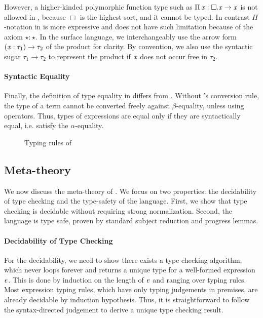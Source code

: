 However, a higher-kinded polymorphic function type such as $\Pi \, \mathit{x}  :  \Box  .  \mathit{x}  \rightarrow  \mathit{x}$ is not allowed in \cc, because $\Box$ is
the highest sort, and it cannot be typed. In contrast $ \Pi $-notation in
\ecore is more expressive and does not have such limitation because of
the axiom $\star:\star$. In the surface language, we
interchangeably use the arrow form $(  \mathit{x}  :  \tau_{{\mathrm{1}}}  )  \rightarrow  \tau_{{\mathrm{2}}}$ of the product for
clarity. By convention, we also use the syntactic sugar $\tau_{{\mathrm{1}}}  \longrightarrow  \tau_{{\mathrm{2}}}$ to represent the product if $\mathit{x}$ does not occur free in
$\tau_{{\mathrm{2}}}$.

\paragraph{Syntactic Equality}
Finally, the definition of type equality in \ecore differs from
\cc. Without \cc's conversion rule, the type of a term cannot be
converted freely against $\beta$-equality, unless using \cast
operators. Thus, types of expressions are equal only if they are
syntactically equal, i.e. satisfy the $\alpha$-equality.

\begin{figure}
    \ottdefnctx{}\ottinterrule
    \ottdefnexpr{}
    \caption{Typing rules of \ecore}
    \label{fig:ecore:typing}
\end{figure}

\subsection{Meta-theory}\label{sec:ecore:meta}
We now discuss the meta-theory of \ecore. We focus on two properties: the
decidability of type checking and the type-safety of the language. First, we
show that type checking \ecore is decidable without requiring strong
normalization. Second, the
language is type safe, proven by standard subject reduction and progress
lemmas.

\paragraph{Decidability of Type Checking}
For the decidability, we need to show there exists a type checking algorithm,
which never loops forever and returns a unique type for a well-formed
expression $\mathit{e}$. This is done by induction on the length of $\mathit{e}$ and
ranging over typing rules. Most expression typing rules, which have only typing
judgements in premises, are already decidable by induction hypothesis. Thus, it
is straightforward to follow the syntax-directed judgement to derive a unique
type checking result.

